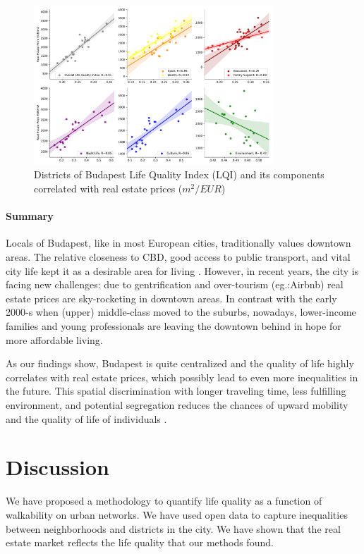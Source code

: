 \begin{figure}[htbp]
	\centering
	\includegraphics[width=0.8\textwidth]{images/lqi/LQI_categories_regplots.pdf}
	\caption{Districts of Budapest Life Quality Index (LQI) and its components correlated with real estate prices ($m^{2}/EUR$)}
	\label{fig:LQI_ev}
\end{figure}

\paragraph{Summary} Locals of Budapest, like in most European cities, traditionally values downtown areas. The relative closeness to CBD, good access to public transport, and vital city life kept it as a desirable area for living \cite{Cassiers2012}. However, in recent years, the city is facing new challenges: due to gentrification \cite{Garcia} and over-tourism (eg.:Airbnb) real estate prices are sky-rocketing in downtown areas. In contrast with the early 2000-s when (upper) middle-class moved to the suburbs, nowadays, lower-income families and young professionals are leaving the downtown behind in hope for more affordable living.

As our findings show, Budapest is quite centralized and the quality of life highly correlates with real estate prices, which possibly lead to even more inequalities in the future. This spatial discrimination with longer traveling time, less fulfilling environment, and potential segregation reduces the chances of upward mobility and the quality of life of individuals \cite{Gobillon}.

\section{Discussion}
We have proposed a methodology to quantify life quality as a function of walkability on urban networks. We have used open data to capture inequalities between neighborhoods and districts in the city. We have shown that the real estate market reflects the life quality that our methods found.

